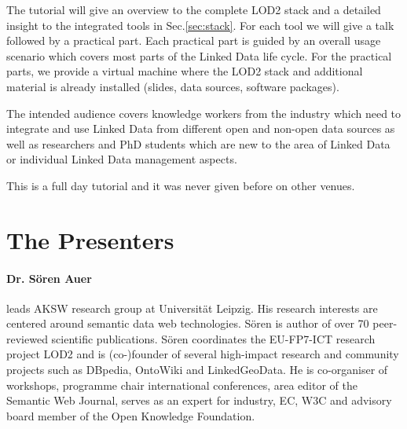 \documentclass[a4paper, 11pt]{llncs}
\begin{document}

The tutorial will give an overview to the complete LOD2 stack and a detailed insight to the integrated tools in Sec.\ref{sec:stack}.
For each tool we will give a talk followed by a practical part.
Each practical part is guided by an overall usage scenario which covers most parts of the Linked Data life cycle.
For the practical parts, we provide a virtual machine where the LOD2 stack and additional material is already installed (slides, data sources, software packages).

The intended audience covers knowledge workers from the industry which need to integrate and use Linked Data from different open and non-open data sources as well as researchers and PhD students which are new to the area of Linked Data or individual Linked Data management aspects.

This is a full day tutorial and it was never given before on other venues.




\section{The Presenters}


\paragraph{Dr. S\"oren Auer} leads AKSW research group at Universit\"at Leipzig.
His research interests are centered around semantic data web technologies.
S\"oren is author of over 70 peer-reviewed scientific publications.
S\"oren coordinates the EU-FP7-ICT research project LOD2 and is (co-)founder of several high-impact research and community projects such as DBpedia, OntoWiki and LinkedGeoData.
He is co-organiser of workshops, programme chair international conferences, area editor of the Semantic Web Journal, serves as an expert for industry, EC, W3C and advisory board member of the Open Knowledge Foundation.
\end{document}
